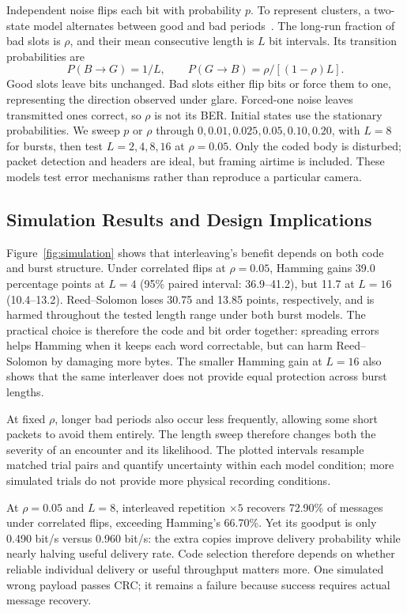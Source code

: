 \documentclass[conference,a4paper]{IEEEtran}
\begin{document}
Independent noise flips each bit with probability $p$. To represent
clusters, a two-state model alternates between good and bad periods~\cite{gilbert}.
The long-run fraction of bad slots is $\rho$, and their mean consecutive
length is $L$ bit intervals. Its transition probabilities are
\begin{equation}
P(B\to G)=1/L,\qquad P(G\to B)=\rho/[(1-\rho)L].
\end{equation}
Good slots leave bits unchanged. Bad slots either flip bits or force them
to one, representing the direction observed under glare. Forced-one noise
leaves transmitted ones correct, so $\rho$ is not its BER. Initial states
use the stationary probabilities. We sweep $p$ or $\rho$ through
$0,0.01,0.025,0.05,0.10,0.20$, with $L=8$ for bursts, then test
$L=2,4,8,16$ at $\rho=0.05$. Only the coded body is disturbed;
packet detection and headers are ideal, but framing airtime is included.
These models test error mechanisms rather than reproduce a particular camera.

\subsection{Simulation Results and Design Implications}
Figure~\ref{fig:simulation} shows that interleaving's benefit depends on
both code and burst structure. Under correlated flips at $\rho=0.05$,
Hamming gains 39.0 percentage points at $L=4$ (95\% paired interval:
36.9--41.2), but 11.7 at $L=16$ (10.4--13.2). Reed--Solomon loses
30.75 and 13.85 points, respectively, and is harmed throughout the tested
length range under both burst models. The practical choice is therefore
the code and bit order together: spreading errors helps Hamming when it
keeps each word correctable, but can harm Reed--Solomon by damaging more
bytes. The smaller Hamming gain at $L=16$ also shows that the same
interleaver does not provide equal protection across burst lengths.

At fixed $\rho$, longer bad periods also occur less frequently, allowing
some short packets to avoid them entirely. The length sweep therefore
changes both the severity of an encounter and its likelihood. The plotted
intervals resample matched trial pairs and quantify uncertainty within
each model condition; more simulated trials do not provide more physical
recording conditions.

At $\rho=0.05$ and $L=8$, interleaved repetition $\times5$ recovers
72.90\% of messages under correlated flips, exceeding Hamming's 66.70\%.
Yet its goodput is only 0.490 bit/s versus 0.960 bit/s: the extra copies
improve delivery probability while nearly halving useful delivery rate.
Code selection therefore depends on whether reliable individual delivery
or useful throughput matters more. One simulated wrong payload passes
CRC; it remains a failure because success requires actual message recovery.
\end{document}
